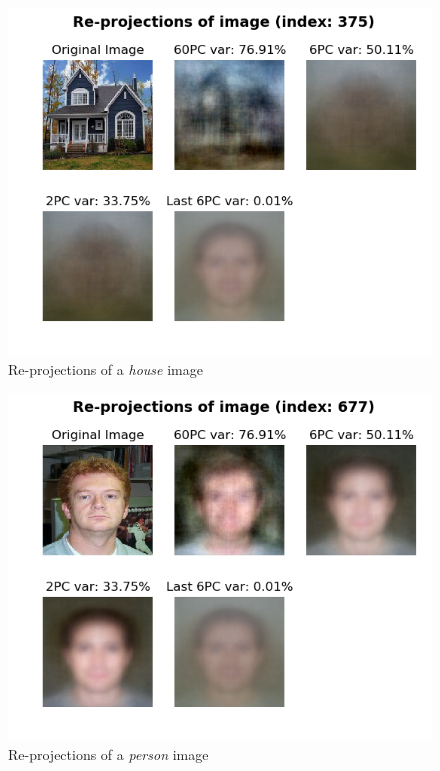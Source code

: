 \documentclass[a4paper, 11pt]{article}
\begin{document}
	\begin{figure}[ht!]
		\centering
		\includegraphics[height=0.5\paperwidth]{img/fig01c.png}
		\caption{Re-projections of a \textit{house} image}
		\label{fig:house1}
	\end{figure}
	\begin{figure}[ht!]
		\centering
		\includegraphics[height=0.5\paperwidth]{img/fig01d.png}
		\caption{Re-projections of a \textit{person} image}
		\label{fig:person1}
	\end{figure}
	
	\FloatBarrier
	
\end{document}
